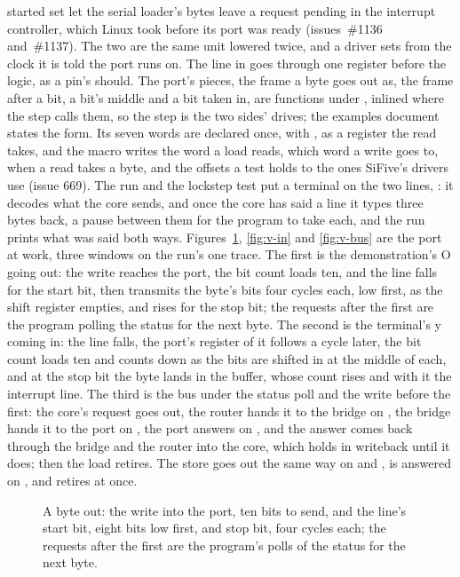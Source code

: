 \documentclass[journal,onecolumn,9pt]{IEEEtran}
\begin{document}
started set let the serial loader's bytes leave a request pending in
the interrupt controller, which Linux took before its port was ready
(issues~\#1136 and~\#1137). The two are the same unit lowered twice, and a driver sets
 from the clock it is told the port runs on. The line in
goes through one register before the logic, as a pin's should. The
port's pieces, the frame a byte goes out as, the frame after a bit, a
bit's middle and a bit taken in, are functions under \code{\#[lower]},
inlined where the step calls them, so the step is the two sides'
drives; the examples document~\cite{examples} states the form. Its
seven words are declared once, with ,  as a
register the read takes, and the macro writes the word a load reads,
which word a write goes to, when a read takes a byte, and the offsets
a test holds to the ones SiFive's drivers use (issue 669). The run and the lockstep
test put a terminal on the two lines, : it decodes
what the core sends, and once the core has said a line it types
three bytes back, a pause between them for the program to take
each, and the run prints what was said both ways.
Figures~\ref{fig:v-out}, \ref{fig:v-in} and \ref{fig:v-bus} are
the port at work, three windows on the run's one trace. The first is
the demonstration's O going out: the write reaches the port, the
bit count loads ten, and the line falls for the start bit, then
transmits the byte's bits four cycles each, low first, as the shift
register empties, and rises for the stop bit; the requests after
the first are the program polling the status for the next byte. The second is the
terminal's y coming in: the line falls, the port's register of it
follows a cycle later, the bit count loads ten and counts down as
the bits are shifted in at the middle of each, and at the stop bit
the byte lands in the buffer, whose count rises and with it the
interrupt line.
The third is the bus under the status poll and the write before the
first: the core's request goes out, the router hands it to the
bridge on , the bridge hands it to the port on ,
the port answers on , and the answer comes back through the
bridge and the router into the core, which holds in writeback until
it does; then the load retires. The store goes out the same way on
 and , is answered on , and retires at
once.

\begin{figure}[htbp]
\centering

\caption{A byte out: the write into the port, ten bits to send, and
the line's start bit, eight bits low first, and stop bit, four
cycles each; the requests after the first are the program's polls
of the status for the next byte.}
\label{fig:v-out}
\end{figure}
\end{document}
